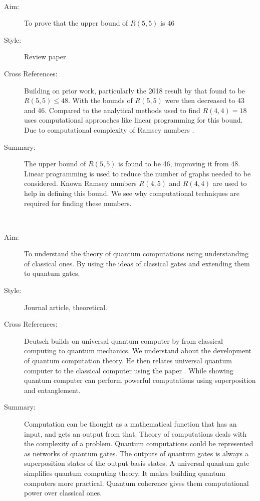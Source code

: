 \documentclass{Assignment}
\begin{document}
\newpage
\cite{angeltveit2024r55le46}~
\begin{description}
	\item[Aim:] 
	To prove that the upper bound of $R(5,5)$ is $46$
	
	\item [Style:] 
	Review paper
	
	\item [Cross References:] 
	Building on prior work, particularly the 2018 result by that found to be $ R(5,5) \leq 48$.
	With \cite{Exoo1993} the bounds of $R(5,5)$ were then decreased to 43 and 46.
	Compared to the analytical methods used to find $R(4,4)=18$\cite{GreenwoodGleason1955} uses computational approaches like linear programming for this bound.
	Due to computational complexity of Ramsey numbers \cite{burr1981generalized}.
	
	
	\item[Summary:] 
	The upper bound of $R(5,5)$ is found to be 46, improving it from 48.
	Linear programming is used to reduce the number of graphs needed to be considered.
	Known Ramsey numbers $R(4,5)$ and $R(4,4)$ are used to help in defining this bound.
	We see why computational techniques are required for finding these numbers.
	
		 

\end{description}
\newpage
\cite{Deutsch1989}~
\begin{description}
	\item [ Aim:]
	To understand the theory of quantum computations using understanding of classical ones.
	By using the ideas of classical gates and extending them to quantum gates.
	\item[Style:]
	Journal article, theoretical.
	
	\item[Cross References:]
	Deutsch builds on universal quantum computer by \cite{deutsch1985quantum} from classical computing to quantum mechanics. 
	We understand about the development of quantum computation theory.
	He then relates universal quantum computer to the classical computer using the paper \cite{Turing1936}.
	While showing quantum computer can perform powerful computations using superposition and entanglement.
	\item [Summary:]
	Computation can be thought as a mathematical function that has an input, and gets an output from that.
	Theory of computations deals with the complexity of a problem.
	Quantum computations could be represented as networks of quantum gates.
	The outputs of quantum gates is always a superposition states of the output basis states.
	A universal quantum gate simplifies quantum computing theory.
	It makes building quantum computers more practical. 
	Quantum coherence gives them computational power over classical ones.
\end{description}
\end{document}
